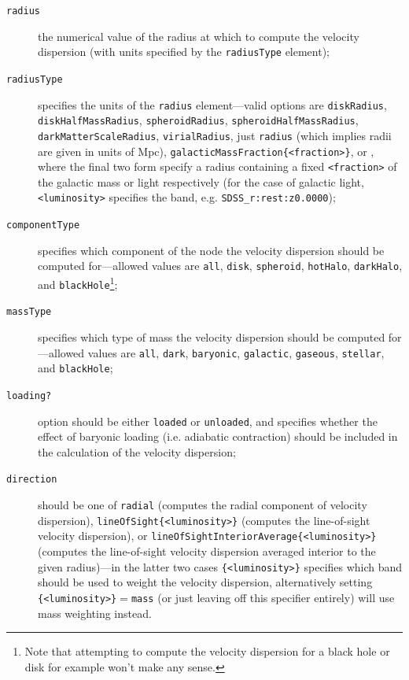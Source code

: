 \begin{description}
 \item [{\tt radius}] the numerical value of the radius at which to compute the velocity dispersion (with units specified by the {\tt radiusType} element);
 \item [{\tt radiusType}] specifies the units of the {\tt radius} element---valid options are {\tt diskRadius}, {\tt diskHalfMassRadius}, {\tt spheroidRadius}, {\tt spheroidHalfMassRadius}, {\tt darkMatterScaleRadius}, {\tt virialRadius}, just {\tt radius} (which implies radii are given in units of Mpc), {\tt galacticMassFraction\{\textless fraction\textgreater\}}, or , where the final two form specify a radius containing a fixed {\tt \textless fraction\textgreater} of the galactic mass or light respectively (for the case of galactic light, {\tt \textless luminosity\textgreater} specifies the band, e.g. {\tt SDSS\_r:rest:z0.0000});
 \item [{\tt componentType}] specifies which component of the node the velocity dispersion should be computed for---allowed values are {\tt all}, {\tt disk}, {\tt spheroid}, {\tt hotHalo}, {\tt darkHalo}, and {\tt blackHole}\footnote{Note that attempting to compute the velocity dispersion for a black hole or disk for example won't make any sense.};
 \item [{\tt massType}] specifies which type of mass the velocity dispersion should be computed for---allowed values are {\tt all}, {\tt dark}, {\tt baryonic}, {\tt galactic}, {\tt gaseous}, {\tt stellar}, and {\tt blackHole};
 \item [{\tt loading?}] option should be either {\tt loaded} or {\tt unloaded}, and specifies whether the effect of baryonic loading (i.e. adiabatic contraction) should be included in the calculation of the velocity dispersion;
 \item [{\tt direction}] should be one of {\tt radial} (computes the radial component of velocity dispersion), {\tt lineOfSight\{\textless luminosity\textgreater\}} (computes the line-of-sight velocity dispersion), or {\tt lineOfSightInteriorAverage\{\textless luminosity\textgreater\}} (computes the line-of-sight velocity dispersion averaged interior to the given radius)---in the latter two cases {\tt \{\textless luminosity\textgreater\}} specifies which band should be used to weight the velocity dispersion, alternatively setting {\tt \{\textless luminosity\textgreater\}}$=${\tt mass} (or just leaving off this specifier entirely) will use mass weighting instead.
\end{description}

